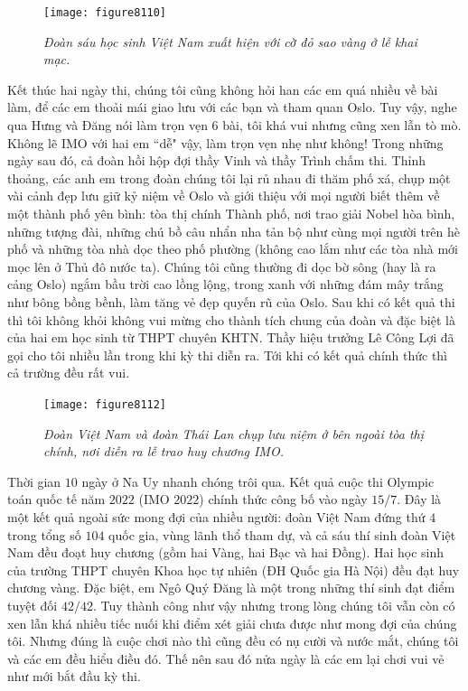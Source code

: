 \begin{multicols}{2}
	\begin{figure}[H]
		\vspace*{-5pt}
		\centering
		\captionsetup{labelformat= empty, justification=centering}
		\texttt{[image: figure8110]}
		\caption{\small\textit{\color{cackithi}Đoàn sáu học sinh Việt Nam xuất hiện với cờ đỏ sao vàng ở lễ khai mạc.}}
		\vspace*{-10pt}
	\end{figure}
	Kết thúc hai ngày thi, chúng tôi cũng không hỏi han các em quá nhiều về bài làm, để các em thoải mái giao lưu với các bạn và tham quan Oslo. Tuy vậy, nghe qua Hưng và Đăng nói làm trọn vẹn $6$ bài, tôi khá vui nhưng cũng xen lẫn tò mò. Không lẽ IMO với hai em ``dễ" vậy, làm trọn vẹn nhẹ như không!
	\vskip 0.05cm
	Trong những ngày sau đó, cả đoàn hồi hộp đợi thầy Vinh và thầy Trình chấm thi. Thỉnh thoảng, các anh em trong đoàn chúng tôi lại rủ nhau đi thăm phố xá, chụp một vài cảnh đẹp lưu giữ kỷ niệm về Oslo và giới thiệu với mọi người biết thêm về một thành phố yên bình: tòa thị chính Thành phố, nơi trao giải Nobel hòa bình, những tượng đài, những chú bồ câu nhẩn nha tản bộ như cùng mọi người trên hè phố và những tòa nhà dọc theo phố phường (không cao lắm như các tòa nhà mới mọc lên ở Thủ đô nước ta). Chúng tôi cũng thường đi dọc bờ sông (hay là ra cảng Oslo) ngắm bầu trời cao lồng lộng, trong xanh với những đám mây trắng như bông bồng bềnh, làm tăng vẻ đẹp quyến rũ của Oslo.
	\vskip 0.05cm
	Sau khi có kết quả thi thì tôi không khỏi không vui mừng cho thành tích chung của đoàn và đặc biệt là của hai em học sinh từ THPT chuyên KHTN. Thầy hiệu trưởng Lê Công Lợi đã gọi cho tôi nhiều lần trong khi kỳ thi diễn ra. Tới khi có kết quả chính thức thì cả trường đều rất vui.
	\begin{figure}[H]
		\vspace*{-5pt}
		\centering
		\captionsetup{labelformat= empty, justification=centering}
		\texttt{[image: figure8112]}
		\caption{\small\textit{\color{cackithi}Đoàn Việt Nam và đoàn Thái Lan chụp lưu niệm ở bên ngoài tòa thị chính, nơi diễn ra lễ trao huy chương IMO.}}
		\vspace*{-10pt}
	\end{figure}
	Thời gian $10$ ngày ở Na Uy nhanh chóng trôi qua.  Kết quả cuộc thi Olympic toán quốc tế năm $2022$ (IMO $2022$) chính thức công bố vào ngày $15/7$. Đây là một kết quả ngoài sức mong đợi của nhiều người: đoàn Việt Nam đứng thứ $4$ trong tổng số $104$ quốc gia, vùng lãnh thổ tham dự, và cả sáu thí sinh đoàn Việt Nam đều đoạt huy chương (gồm hai Vàng, hai Bạc và hai Đồng). Hai học sinh của trường THPT chuyên Khoa học tự nhiên (ĐH Quốc gia Hà Nội) đều đạt huy chương vàng. Đặc biệt, em Ngô Quý Đăng là một trong những thí sinh đạt điểm tuyệt đối $42/42$. Tuy thành công như vậy nhưng trong lòng chúng tôi vẫn còn có xen lẫn khá nhiều tiếc nuối khi điểm xét giải  chưa được như mong đợi của chúng tôi. Nhưng đúng là cuộc chơi nào thì cũng đều có nụ cười và nước mắt, chúng tôi và các em đều hiểu điều đó. Thế nên sau đó nửa ngày là các em lại chơi vui vẻ như mới bắt đầu kỳ thi.

\end{multicols}

